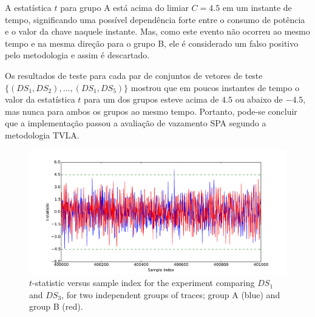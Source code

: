 A estatística $t$ para grupo A está acima do limiar $C = 4.5$ em um instante de tempo, significando uma possível dependência forte entre o consumo de potência e o valor da chave naquele instante. Mas, como este evento não ocorreu ao mesmo tempo e na mesma direção para o grupo B, ele é considerado um falso positivo pelo metodologia e assim é descartado.
%
%

Os resultados de teste para cada par de conjuntos de vetores de teste $ \{(DS_1,DS_2), \dots, (DS_1,DS_5) \}$ mostrou que em poucos instantes de tempo o valor da estatística $t$ para um dos grupos esteve acima de $4.5$ ou abaixo de $-4.5$, mas nunca para ambos os grupos ao mesmo tempo.
%
Portanto, pode-se concluir que a implementação passou a avaliação de vazamento SPA segundo a metodologia TVLA.

\begin{figure}[htb]
	\centering
	\centerline{
		\includegraphics[width=1.1\textwidth]{figures/graph__t_statistic__x__sample_index_for_groups_A_and_B__pair_DS1_DS3-eps-converted-to.pdf}
	}
	\caption{$t$-statistic versus sample index for the experiment comparing $DS_1$ and $DS_3$, for two independent groups of traces; group A (blue) and group B (red).}
	\label{fig:graph__t_statistic__x__sample_index_for_groups_A_and_B__pair_DS1_DS3}
\end{figure}